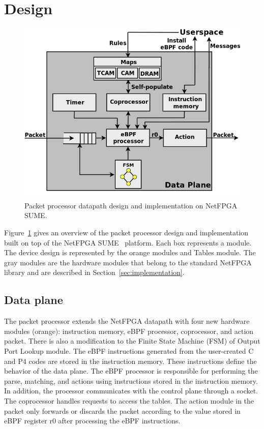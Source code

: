 \section{\system Design}
\label{sec:design}

\begin{figure}[!htbp]
\centering
\includegraphics[width=1.\linewidth]{figures/06_fig01.png}
\caption{Packet processor datapath design and implementation on NetFPGA SUME.}
\label{fig:06_fig01}
\end{figure}

Figure~\ref{fig:06_fig01} gives an overview of the packet processor design and implementation built on top of the NetFPGA SUME~\cite{SUME2014} platform. 
Each box represents a module.
The device design is represented by the orange modules and Tables module.
The gray modules are the hardware modules that belong to the standard NetFPGA library and are described in Section~\ref{sec:implementation}.


\subsection{Data plane}

The packet processor extends the NetFPGA datapath with four new hardware modules (orange): instruction memory, eBPF processor, coprocessor, and action packet. There is also a modification to the Finite State Machine (FSM) of Output Port Lookup module. The eBPF instructions generated from the user-created C and P4 codes are stored in the instruction memory. These instructions define the behavior of the data plane. The eBPF processor is responsible for performing the parse, matching, and actions using instructions stored in the instruction memory. In addition, the processor communicates with the control plane through a socket. The coprocessor handles requests to access the tables. The action module in the packet only forwards or discards the packet according to the value stored in eBPF register r0 after processing the eBPF instructions. %

